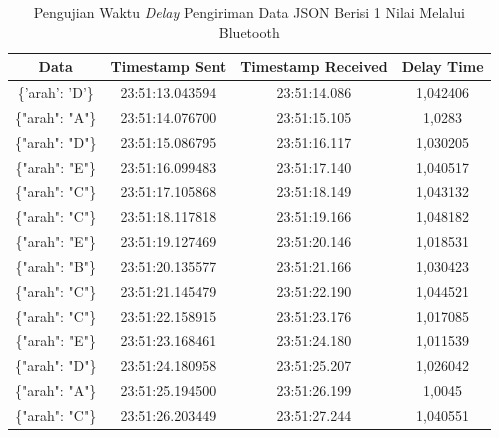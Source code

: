 \begin{longtable}{|ccc|c|}
  \caption{Pengujian Waktu \emph{Delay} Pengiriman Data JSON Berisi 1 Nilai Melalui Bluetooth}
  \label{tbl:delayBluetoothJSON1}\\
  \hline
  \multicolumn{1}{|c|}{Data}            & \multicolumn{1}{c|}{Timestamp Sent}  & Timestamp Received & Delay Time  \\ \hline
  \endfirsthead
  \endhead
  \multicolumn{1}{|c|}{\{'arah': 'D'\}} & \multicolumn{1}{c|}{23:51:13.043594} & 23:51:14.086       & 1,042406    \\ \hline
  \multicolumn{1}{|c|}{\{"arah": "A"\}} & \multicolumn{1}{c|}{23:51:14.076700} & 23:51:15.105       & 1,0283      \\ \hline
  \multicolumn{1}{|c|}{\{"arah": "D"\}} & \multicolumn{1}{c|}{23:51:15.086795} & 23:51:16.117       & 1,030205    \\ \hline
  \multicolumn{1}{|c|}{\{"arah": "E"\}} & \multicolumn{1}{c|}{23:51:16.099483} & 23:51:17.140       & 1,040517    \\ \hline
  \multicolumn{1}{|c|}{\{"arah": "C"\}} & \multicolumn{1}{c|}{23:51:17.105868} & 23:51:18.149       & 1,043132    \\ \hline
  \multicolumn{1}{|c|}{\{"arah": "C"\}} & \multicolumn{1}{c|}{23:51:18.117818} & 23:51:19.166       & 1,048182    \\ \hline
  \multicolumn{1}{|c|}{\{"arah": "E"\}} & \multicolumn{1}{c|}{23:51:19.127469} & 23:51:20.146       & 1,018531    \\ \hline
  \multicolumn{1}{|c|}{\{"arah": "B"\}} & \multicolumn{1}{c|}{23:51:20.135577} & 23:51:21.166       & 1,030423    \\ \hline
  \multicolumn{1}{|c|}{\{"arah": "C"\}} & \multicolumn{1}{c|}{23:51:21.145479} & 23:51:22.190       & 1,044521    \\ \hline
  \multicolumn{1}{|c|}{\{"arah": "C"\}} & \multicolumn{1}{c|}{23:51:22.158915} & 23:51:23.176       & 1,017085    \\ \hline
  \multicolumn{1}{|c|}{\{"arah": "E"\}} & \multicolumn{1}{c|}{23:51:23.168461} & 23:51:24.180       & 1,011539    \\ \hline
  \multicolumn{1}{|c|}{\{"arah": "D"\}} & \multicolumn{1}{c|}{23:51:24.180958} & 23:51:25.207       & 1,026042    \\ \hline
  \multicolumn{1}{|c|}{\{"arah": "A"\}} & \multicolumn{1}{c|}{23:51:25.194500} & 23:51:26.199       & 1,0045      \\ \hline
  \multicolumn{1}{|c|}{\{"arah": "C"\}} & \multicolumn{1}{c|}{23:51:26.203449} & 23:51:27.244       & 1,040551    \\ \hline

\end{longtable}
